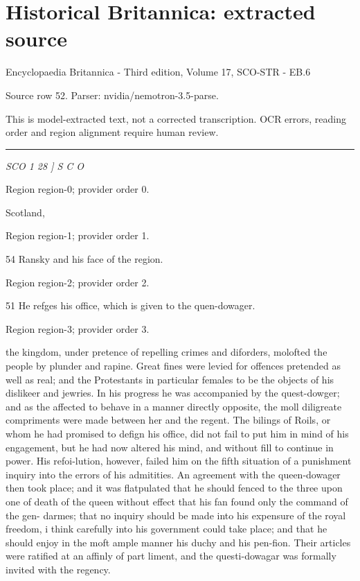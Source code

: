 \documentclass[11pt]{article}
\begin{document}
\section*{Historical Britannica: extracted source}
Encyclopaedia Britannica - Third edition, Volume 17, SCO-STR - EB.6\par
{\small Source row 52. Parser: nvidia/nemotron-3.5-parse.\par}
{\small This is model-extracted text, not a corrected transcription. OCR errors, reading order and region alignment require human review.\par}
\hrule\medskip
{\small\itshape SCO 1 28 ] S C O\par}

{\scriptsize\color{gray} Region region-0; provider order 0.\par}
\medskip

Scotland,
\par

{\scriptsize\color{gray} Region region-1; provider order 1.\par}
\medskip

54 Ransky and his face of the region.
\par

{\scriptsize\color{gray} Region region-2; provider order 2.\par}
\medskip

51 He refges his office, which is given to the quen-dowager.
\par

{\scriptsize\color{gray} Region region-3; provider order 3.\par}
\medskip

the kingdom, under pretence of repelling crimes and diforders, molofted the people by plunder and rapine. Great fines were levied for offences pretended as well as real; and the Protestants in particular females to be the objects of his dislikeer and jewries. In his progress he was accompanied by the quest-dowger; and as the affected to behave in a manner directly opposite, the moll diligreate compriments were made between her and the regent. The bilings of Roils, or whom he had promised to defign his office, did not fail to put him in mind of his engagement, but he had now altered his mind, and without fill to continue in power. His refoi-lution, however, failed him on the fifth situation of a punishment inquiry into the errors of his admitities. An agreement with the queen-dowager then took place; and it was flatpulated that he should fenced to the three upon one of death of the queen without effect that his fan found only the command of the gen- darmes; that no inquiry should be made into his expensure of the royal freedom, i think carefully into his government could take place; and that he should enjoy in the moft ample manner his duchy and his pen-fion. Their articles were ratified at an affinly of part liment, and the questi-dowagar was formally invited with the regency.
\par
\end{document}
